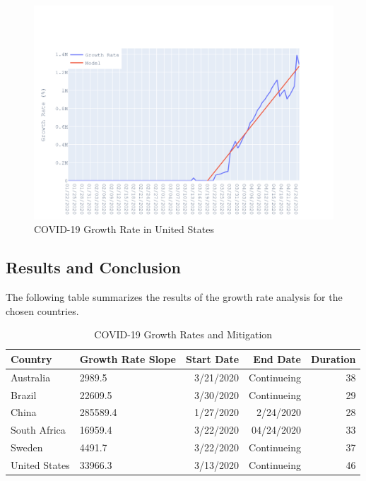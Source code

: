 \documentclass{homework}
\begin{document}
\begin{figure}[H]
  \centering
  \includegraphics[scale=0.3]{task3/US.png}
  \caption{COVID-19 Growth Rate in United States}
\end{figure}

\newpage
\subsection{Results and Conclusion}

The following table summarizes the results of the growth rate analysis for the chosen countries. 

\begin{table}[H]
  \caption{COVID-19 Growth Rates and Mitigation}
  \label{Task 3 Results}
  \centering
  \begin{tabular}{llrrr}
    \toprule
    Country       & Growth Rate Slope & Start Date & End Date    & Duration \\
    \midrule
    Australia     & 2989.5            & 3/21/2020  & Continueing & 38       \\
    Brazil        & 22609.5           & 3/30/2020  & Continueing & 29       \\
    China         & 285589.4          & 1/27/2020  & 2/24/2020   & 28       \\
    South Africa  & 16959.4           & 3/22/2020  & 04/24/2020  & 33       \\
    Sweden        & 4491.7            & 3/22/2020  & Continueing & 37       \\
    United States & 33966.3           & 3/13/2020  & Continueing & 46       \\
    \bottomrule
  \end{tabular}
\end{table}
\end{document}
